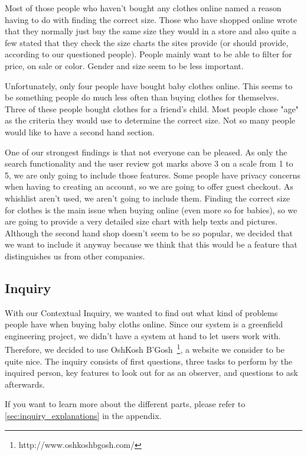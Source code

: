 Most of those people who haven't bought any clothes online named a reason having to do with finding the correct size. Those who have shopped online wrote that they normally just buy the same size they would in a store and also quite a few stated that they check the size charts the sites provide (or should provide, according to our questioned people).
People mainly want to be able to filter for price, on sale or color. Gender and size seem to be less important. 

Unfortunately, only four people have bought baby clothes online. This seems to be something people do much less often than buying clothes for themselves. Three of these people bought clothes for a friend's child. Most people chose "age" as the criteria they would use to determine the correct size. Not so many people would like to have a second hand section.

One of our strongest findings is that not everyone can be pleased. As only the search functionality and the user review got marks above 3 on a scale from 1 to 5, we are only going to include those features. Some people have privacy concerns when having to creating an account, so we are going to offer guest checkout. As whishlist aren't used, we aren't going to include them. Finding the correct size for clothes is the main issue when buying online (even more so for babies), so we are going to provide a very detailed size chart with help texts and pictures. Although the second hand shop doesn't seem to be so popular, we decided that we want to include it anyway because we think that this would be a feature that distinguishes us from other companies. 

\subsection{Inquiry}
With our Contextual Inquiry, we wanted to find out what kind of problems people have when buying baby cloths online. 
Since our system is a greenfield engineering project, we didn't have a system at hand to let users work with. Therefore, we decided to use OshKosh B'Gosh~\footnote{http://www.oshkoshbgosh.com/}, a website we consider to be quite nice.
The inquiry consists of first questions, three tasks to perform by the inquired person, key features to look out for as an observer, and questions to ask afterwards.

If you want to learn more about the different parts, please refer to \ref{sec:inquiry_explanations} in the appendix.

